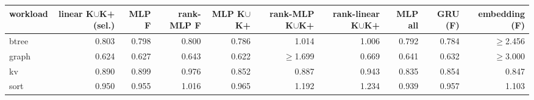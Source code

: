 \begin{tabular}{lrrrrrrrrr}
\toprule
workload & linear K$\cup$K{+} (sel.) & MLP F & rank-MLP F & MLP K$\cup$K{+} & rank-MLP K$\cup$K{+} & rank-linear K$\cup$K{+} & MLP all & GRU (F) & embedding (F) \\
\midrule
btree & 0.803 & 0.798 & 0.800 & 0.786 & 1.014 & 1.006 & 0.792 & 0.784 & $\geq$2.456 \\
graph & 0.624 & 0.627 & 0.643 & 0.622 & $\geq$1.699 & 0.669 & 0.641 & 0.632 & $\geq$3.000 \\
kv & 0.890 & 0.899 & 0.976 & 0.852 & 0.887 & 0.943 & 0.835 & 0.854 & 0.847 \\
sort & 0.950 & 0.955 & 1.016 & 0.965 & 1.192 & 1.234 & 0.939 & 0.957 & 1.103 \\
\bottomrule
\end{tabular}
